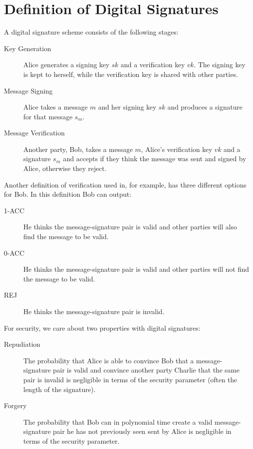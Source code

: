 \documentclass[%
 reprint,
 amsmath,amssymb,
 aps,
 pra,
]{revtex4-1}
\begin{document}
\section{Definition of Digital Signatures}

A digital signature scheme consists of the following stages:

\begin{description}
\item[Key Generation]Alice generates a signing key $sk$ and a verification key $vk$. The signing key is kept to herself, while the verification key is shared with other parties.
\item[Message Signing]Alice takes a message $m$ and her signing key $sk$ and produces a signature for that message $s_m$.
\item[Message Verification]Another party, Bob, takes a message $m$, Alice's verification key $vk$ and a signature $s_m$ and accepts if they think the message was sent and signed by Alice, otherwise they reject.
\end{description}

Another definition of verification used in, for example, \cite{quant-ph/0105032} has three different options for Bob. In this definition Bob can output:

\begin{description}
\item[1-ACC]He thinks the message-signature pair is valid and other parties will also find the message to be valid.
\item[0-ACC]He thinks the message-signature pair is valid and other parties will not find the message to be valid.
\item[REJ]He thinks the message-signature pair is invalid.
\end{description}

For security, we care about two properties with digital signatures:

\begin{description}
\item[Repudiation]The probability that Alice is able to convince Bob that a message-signature pair is valid and convince another party Charlie that the same pair is invalid is negligible in terms of the security parameter (often the length of the signature).
\item[Forgery]The probability that Bob can in polynomial time create a valid message-signature pair he has not previously seen sent by Alice is negligible in terms of the security parameter.
\end{description}
\end{document}
